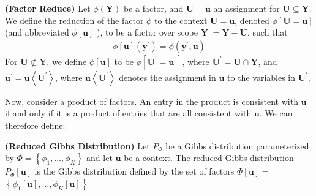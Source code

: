 \documentclass{article}
\newcommand{\bfs}[1]{\textbf{({#1}) }}
\begin{document}
\begin{defa}\bfs{Factor Reduce}
 Let $\phi(\boldsymbol{Y})$ be a factor, and $\boldsymbol{U}=\boldsymbol{u}$ an assignment for $\boldsymbol{U} \subseteq \boldsymbol{Y}$. We define the reduction of the factor $\phi$ to the context $\boldsymbol{U}=\boldsymbol{u}$, denoted $\phi[\boldsymbol{U}=\boldsymbol{u}]$ (and abbreviated $\phi[\boldsymbol{u}]$ ), to be a factor over scope $\boldsymbol{Y}^{\prime}=\boldsymbol{Y}-\boldsymbol{U}$, such that
\begin{align*}
\phi[\boldsymbol{u}]\left(\boldsymbol{y}^{\prime}\right)=\phi\left(\boldsymbol{y}^{\prime}, \boldsymbol{u}\right)
\end{align*}
For $\boldsymbol{U} \not \subset \boldsymbol{Y}$, we define $\phi[\boldsymbol{u}]$ to be $\phi\left[\boldsymbol{U}^{\prime}=\boldsymbol{u}^{\prime}\right]$, where $\boldsymbol{U}^{\prime}=\boldsymbol{U} \cap \boldsymbol{Y}$, and $\boldsymbol{u}^{\prime}=\boldsymbol{u}\left\langle\boldsymbol{U}^{\prime}\right\rangle$, where $\boldsymbol{u}\left\langle\boldsymbol{U}^{\prime}\right\rangle$ denotes the assignment in $\boldsymbol{u}$ to the variables in $\boldsymbol{U}^{\prime}$.
\end{defa}
Now, consider a product of factors. An entry in the product is consistent with $\boldsymbol{u}$ if and only if it is a product of entries that are all consistent with $\boldsymbol{u}$. We can therefore define:
\begin{defa}\bfs{Reduced Gibbs Distribution}
 Let $P_{\Phi}$ be a Gibbs distribution parameterized by $\Phi=\left\{\phi_{1}, \ldots, \phi_{K}\right\}$ and let $\boldsymbol{u}$ be a context. The reduced Gibbs distribution $P_{\Phi}[\boldsymbol{u}]$ is the Gibbs distribution defined by the set of factors $\Phi[\boldsymbol{u}]=$ $\left\{\phi_{1}[\boldsymbol{u}], \ldots, \phi_{K}[\boldsymbol{u}]\right\}$

\end{defa}
\end{document}
